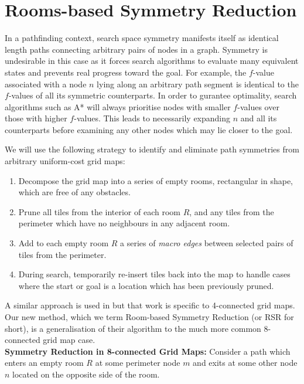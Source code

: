 \section{Rooms-based Symmetry Reduction}
In a pathfinding context, search space symmetry manifests itself as identical
length paths connecting arbitrary pairs of nodes in a graph. 
Symmetry is undesirable in this case as it forces search algorithms to evaluate 
many equivalent states and prevents real progress toward the goal.
For example, the $f$-value associated with a node $n$ lying along an arbitrary
 path segment is identical to the $f$-values of all its symmetric counterparts.
In order to gurantee optimality, search algorithms such as A* will always prioritise
nodes with smaller $f$-values over those with higher $f$-values. This leads to
necessarily expanding $n$ and all its counterparts before examining any other
nodes which may lie closer to the goal.
\par
We will use the following strategy to identify and eliminate path symmetries
from arbitrary uniform-cost grid maps: 
\begin{enumerate}
\item{Decompose the grid map into a series of empty rooms, rectangular in shape, which are free of any obstacles.}
\item{Prune all tiles from the interior of each room $R$, and any tiles from the
perimeter which have no neighbours in any adjacent room.} 
\item{Add to each empty room $R$ a series of \emph{macro edges} between 
selected pairs of tiles from the perimeter.}
\item{During search, temporarily re-insert tiles back into the map to handle cases where the
start or goal is a location which has been previously pruned.}
\end{enumerate}
A similar approach is used in \cite{harabor10} but that work is specific to
4-connected grid maps. 
Our new method, which we term Room-based Symmetry Reduction (or RSR for short),
is a generalisation of their algorithm to the much more common 8-connected
grid map case.
\newline \\
\textbf{Symmetry Reduction in 8-connected Grid Maps:}
Consider a path which enters an empty room $R$ at some perimeter node $m$ and exits at some other
node $n$ located on the opposite side of the room.
